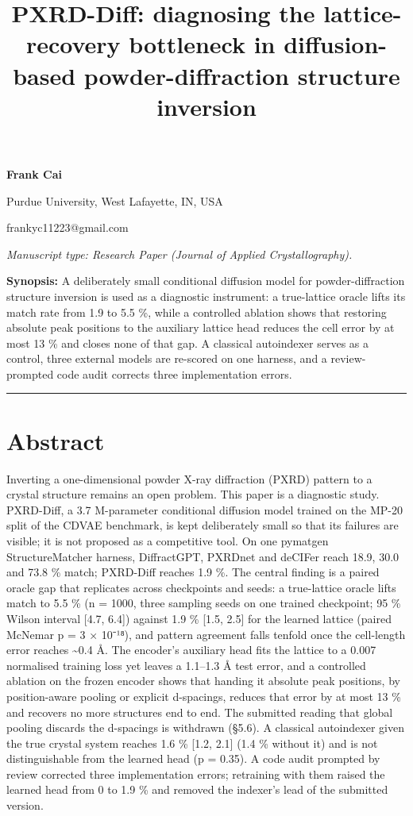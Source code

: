 \documentclass[
  11pt,
]{article}
\title{PXRD-Diff: diagnosing the lattice-recovery bottleneck in
diffusion-based powder-diffraction structure inversion}
\author{}
\date{}
\newcounter{none} %
\begin{document}
\maketitle

\textbf{Frank Cai}

Purdue University, West Lafayette, IN, USA

frankyc11223@gmail.com

\emph{Manuscript type: Research Paper (Journal of Applied
Crystallography).}

\textbf{Synopsis:} A deliberately small conditional diffusion model for
powder-diffraction structure inversion is used as a diagnostic
instrument: a true-lattice oracle lifts its match rate from 1.9 to 5.5
\%, while a controlled ablation shows that restoring absolute peak
positions to the auxiliary lattice head reduces the cell error by at
most 13 \% and closes none of that gap. A classical autoindexer serves
as a control, three external models are re-scored on one harness, and a
review-prompted code audit corrects three implementation errors.

\begin{center}\rule{0.5\linewidth}{0.5pt}\end{center}

\section{Abstract}\label{abstract}

Inverting a one-dimensional powder X-ray diffraction (PXRD) pattern to a
crystal structure remains an open problem. This paper is a diagnostic
study. PXRD-Diff, a 3.7 M-parameter conditional diffusion model trained
on the MP-20 split of the CDVAE benchmark, is kept deliberately small so
that its failures are visible; it is not proposed as a competitive tool.
On one pymatgen StructureMatcher harness, DiffractGPT, PXRDnet and
deCIFer reach 18.9, 30.0 and 73.8 \% match; PXRD-Diff reaches 1.9 \%.
The central finding is a paired oracle gap that replicates across
checkpoints and seeds: a true-lattice oracle lifts match to 5.5 \% (n =
1000, three sampling seeds on one trained checkpoint; 95 \% Wilson
interval {[}4.7, 6.4{]}) against 1.9 \% {[}1.5, 2.5{]} for the learned
lattice (paired McNemar p = 3 × 10⁻¹⁸), and pattern agreement falls
tenfold once the cell-length error reaches \textasciitilde0.4 Å. The
encoder's auxiliary head fits the lattice to a 0.007 normalised training
loss yet leaves a 1.1--1.3 Å test error, and a controlled ablation on
the frozen encoder shows that handing it absolute peak positions, by
position-aware pooling or explicit d-spacings, reduces that error by at
most 13 \% and recovers no more structures end to end. The submitted
reading that global pooling discards the d-spacings is withdrawn (§5.6).
A classical autoindexer given the true crystal system reaches 1.6 \%
{[}1.2, 2.1{]} (1.4 \% without it) and is not distinguishable from the
learned head (p = 0.35). A code audit prompted by review corrected three
implementation errors; retraining with them raised the learned head from
0 to 1.9 \% and removed the indexer's lead of the submitted version.
\end{document}
